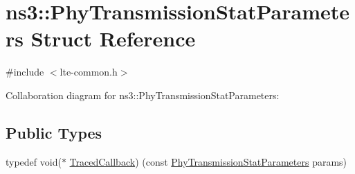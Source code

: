\hypertarget{structns3_1_1PhyTransmissionStatParameters}{}\section{ns3\+:\+:Phy\+Transmission\+Stat\+Parameters Struct Reference}
\label{structns3_1_1PhyTransmissionStatParameters}


{\ttfamily \#include $<$lte-\/common.\+h$>$}



Collaboration diagram for ns3\+:\+:Phy\+Transmission\+Stat\+Parameters\+:
\subsection*{Public Types}
\begin{DoxyCompactItemize}
\item 
typedef void($\ast$ \hyperlink{structns3_1_1PhyTransmissionStatParameters_aebba0b6c1acfc474d50de729df924183}{Traced\+Callback}) (const \hyperlink{structns3_1_1PhyTransmissionStatParameters}{Phy\+Transmission\+Stat\+Parameters} params)
\end{DoxyCompactItemize}
